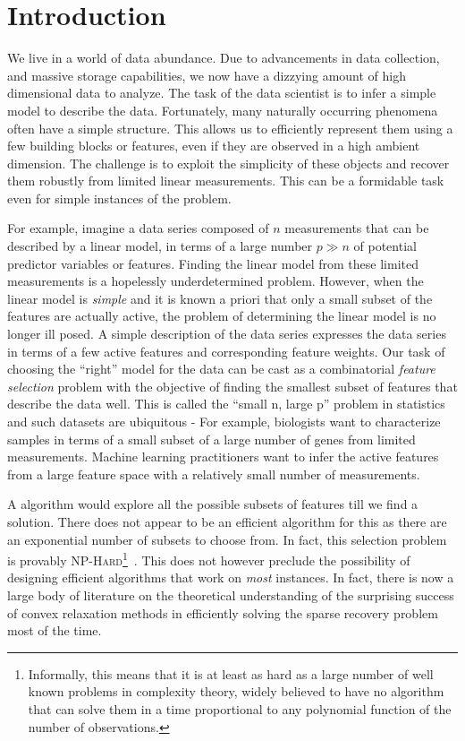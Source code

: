 \chapter{Introduction}

We live in a world of data abundance. Due to advancements in data collection,
and massive storage capabilities, we now have a dizzying amount of high
dimensional data to analyze. The task of the data scientist is to infer a simple
model to describe the data. Fortunately, many naturally occurring phenomena
often have a simple structure. This allows us to efficiently represent them
using a few building blocks or features, even if they are observed in a high
ambient dimension. The challenge is to exploit the simplicity of these objects
and recover them robustly from limited linear measurements. This can be a
formidable task even for simple instances of the problem.

For example, imagine a data series composed of $n$ measurements that can be
described by a linear model, in terms of a large number $p \gg n$ of potential
predictor variables or features. Finding the linear model from these limited
measurements is a hopelessly underdetermined problem. However, when the linear
model is \emph{simple} and it is known a priori that only a small subset of the
features are actually active, the problem of determining the linear model is no
longer ill posed. A simple description of the data series expresses the data
series in terms of a few active features and corresponding feature weights. Our
task of choosing the ``right'' model for the data can be cast as a combinatorial
\emph{feature selection} problem with the objective of finding the smallest
subset of features that describe the data well. This is called the ``small n,
large p'' problem in statistics and such datasets are ubiquitous - For example,
biologists want to characterize samples in terms of a small subset of a large
number of genes from limited measurements. Machine learning practitioners want
to infer the active features from a large feature space with a relatively small
number of measurements.

A \naive{} algorithm would explore all the possible subsets of features till we
find a solution. There does not appear to be an efficient algorithm for this as
there are an exponential number of subsets to choose from. In fact, this
selection problem is provably \textsc{NP-Hard}\footnote{Informally, this means
that it is at least as hard as a large number of well known problems in
complexity theory, widely believed to have no algorithm that can solve them in a
time proportional to any polynomial function of the number of
observations.}~\cite{Natarajan95}. This does not however preclude the
possibility of designing efficient algorithms that work on \emph{most}
instances. In fact, there is now a large body of literature on the theoretical
understanding of the surprising success of convex relaxation methods in
efficiently solving the sparse recovery problem most of the time.


